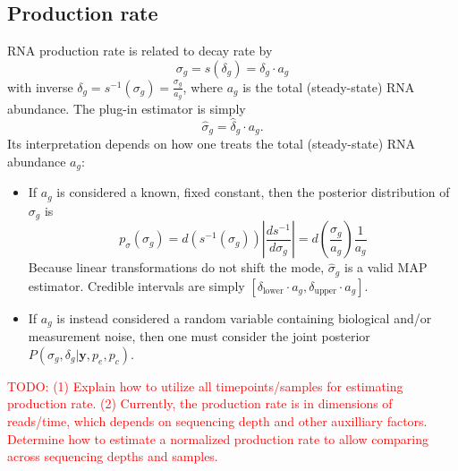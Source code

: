 \documentclass[11pt]{article}
\begin{document}
\subsection{Production rate}

RNA production rate is related to decay rate by
$$
\sigma_g = s(\delta_g) = \delta_g \cdot a_g
$$
with inverse $\delta_g = s^{-1}(\sigma_g) = \frac{\sigma_g}{a_g}$, where $a_g$ is the total (steady-state) RNA abundance. The plug-in estimator is simply
$$
\hat{\sigma}_g = \hat{\delta}_g \cdot a_g.
$$
Its interpretation depends on how one treats the total (steady-state) RNA abundance $a_g$:
\begin{itemize}
\item If $a_g$ is considered a known, fixed constant, then the posterior distribution of $\sigma_g$ is
$$
p_\sigma(\sigma_g)
= d(s^{-1}(\sigma_g)) \left\lvert\frac{ds^{-1}}{d\sigma_g}\right\rvert
= d\left(\frac{\sigma_g}{a_g}\right) \frac{1}{a_g}
$$
Because linear transformations do not shift the mode, $\hat{\sigma}_g$ is a valid MAP estimator. Credible intervals are simply $[\delta_\text{lower} \cdot a_g, \delta_\text{upper} \cdot a_g]$.
\item If $a_g$ is instead considered a random variable containing biological and/or measurement noise, then one must consider the joint posterior $P(\sigma_g, \delta_g | \mathbf{y}, p_e, p_c)$.
\end{itemize}

\textcolor{red}{TODO: (1) Explain how to utilize all timepoints/samples for estimating production rate. (2) Currently, the production rate is in dimensions of reads/time, which depends on sequencing depth and other auxilliary factors. Determine how to estimate a normalized production rate to allow comparing across sequencing depths and samples.}
\end{document}
